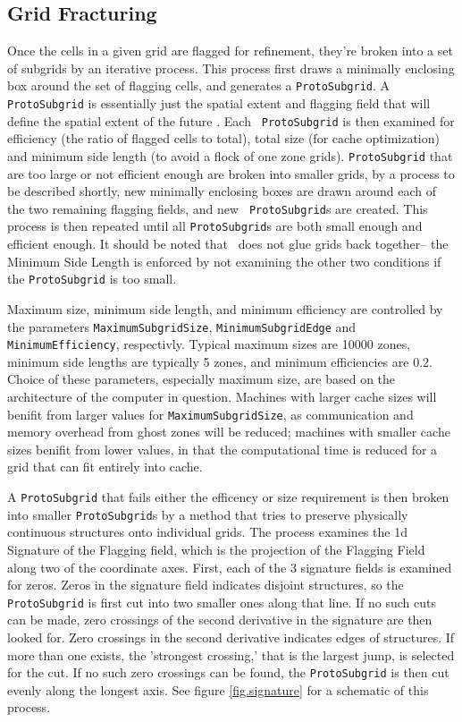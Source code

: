 \subsection{Grid Fracturing}\label{app.subgrid_creation}
Once the cells in a given grid are flagged for refinement, they're
broken into a set of subgrids by an iterative process.  This process
first draws a minimally enclosing box around the set of flagging
cells, and generates a {\tt ProtoSubgrid}.  A {\tt ProtoSubgrid} is
essentially just the spatial extent and flagging field that will
define the spatial extent of the future \grid.  Each {\tt
  ProtoSubgrid} is then examined for efficiency (the ratio of flagged cells to
total), total size (for cache optimization) and minimum side
length (to avoid a flock of one zone grids).  {\tt ProtoSubgrid} that are too
large or not efficient enough are broken into smaller grids, by a
process to be described shortly, new minimally enclosing boxes are
drawn around each of the two remaining flagging fields, and new {\tt
  ProtoSubgrid}s are created.  This process is then repeated until
all {\tt ProtoSubgrid}s are both small enough and efficient enough.
It should be noted that \enzo\ does not glue grids back together-- the
Minimum Side Length is enforced by not examining the other two
conditions if the {\tt ProtoSubgrid} is too small.  

Maximum size, minimum side length,  and minimum efficiency are
controlled by the parameters {\tt MaximumSubgridSize}, {\tt MinimumSubgridEdge} and {\tt
  MinimumEfficiency}, respectivly. Typical maximum sizes are 10000 zones, minimum
side lengths are typically 5 zones, and minimum efficiencies are  0.2.
Choice of these parameters, especially maximum size, are
based on the architecture of the computer in question.  
Machines with larger cache sizes will benifit from larger values for
{\tt MaximumSubgridSize}, as communication and memory overhead from
ghost zones will be reduced; machines with smaller cache sizes benifit
from lower values, in that the computational time is reduced for a
grid that can fit entirely into cache.  

A {\tt ProtoSubgrid} that fails either the efficency or size
requirement is then broken into smaller {\tt ProtoSubgrid}s by a
method that tries to preserve physically continuous structures onto
individual grids.  The process examines the 1d Signature of the Flagging
field, which is the projection of the Flagging Field along two of the
coordinate axes.  First, each of the 3 signature fields is examined
for zeros.  Zeros in the signature field indicates disjoint
structures, so the {\tt ProtoSubgrid} is first cut into two smaller
ones along that line.  If no such cuts can be made, zero crossings of
the second derivative in the signature are then looked for.  Zero
crossings in the second derivative indicates edges of structures.  If
more than one exists, the 'strongest crossing,' that is the largest
jump, is selected for the cut.  If no such zero crossings can be
found, the {\tt ProtoSubgrid} is then cut evenly along the longest
axis.  See figure \ref{fig.signature} for a schematic of this process.

